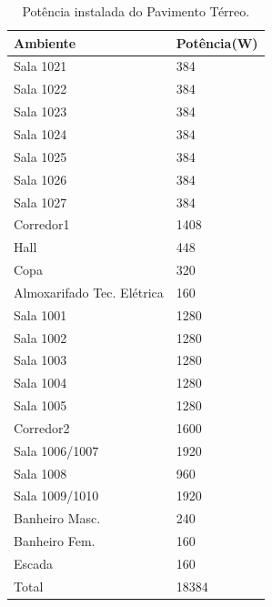 \begin{table}[H]
\centering
\caption{Potência instalada do Pavimento Térreo.}
\label{tab_terreo}
\begin{tabular}{ll}\hline
Ambiente                   & Potência(W) \\\hline
Sala 1021                  & 384         \\
Sala 1022                  & 384         \\
Sala 1023                  & 384         \\
Sala 1024                  & 384         \\
Sala 1025                  & 384         \\
Sala 1026                  & 384         \\
Sala 1027                  & 384         \\
Corredor1                  & 1408        \\
Hall                       & 448         \\
Copa                       & 320         \\
Almoxarifado Tec. Elétrica & 160         \\
Sala 1001                  & 1280        \\
Sala 1002                  & 1280        \\
Sala 1003                  & 1280        \\
Sala 1004                  & 1280        \\
Sala 1005                  & 1280        \\
Corredor2                  & 1600        \\
Sala 1006/1007             & 1920        \\
Sala 1008                  & 960         \\
Sala 1009/1010             & 1920        \\
Banheiro Masc.             & 240         \\
Banheiro Fem.              & 160         \\
Escada                     & 160         \\\hline
Total                      & 18384  \\\hline    
\end{tabular}
\end{table}

